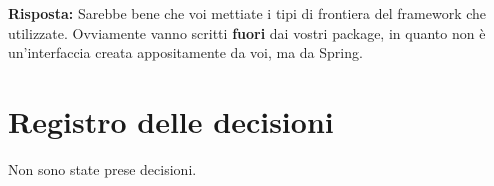 \documentclass{article}
\begin{document}
\textbf{Risposta:} Sarebbe bene che voi mettiate i tipi di frontiera del framework che utilizzate. Ovviamente vanno scritti \textbf{fuori} dai vostri package, in quanto non è un'interfaccia creata appositamente da voi, ma da Spring.

\newpage
\section{Registro delle decisioni}%
\label{sec:registro_delle_decisioni}

Non sono state prese decisioni.

\end{document}
